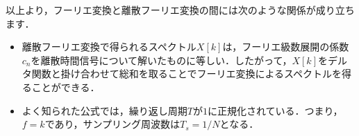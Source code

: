 以上より，フーリエ変換と離散フーリエ変換の間には次のような関係が成り立ちます．
\begin{itemize}
\item 離散フーリエ変換で得られるスペクトル$X[k]$は，フーリエ級数展開の係数$c_n$を離散時間信号について解いたものに等しい．したがって，$X[k]$をデルタ関数と掛け合わせて総和を取ることでフーリエ変換によるスペクトルを得ることができる．
\item よく知られた公式では，繰り返し周期$T$が$1$に正規化されている．つまり，$f=k$であり，サンプリング周波数は$T_s = 1/N$となる．
\end{itemize}

